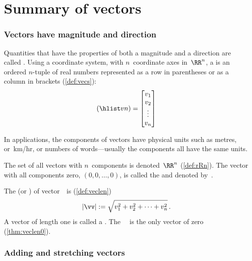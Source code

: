 
\section{Summary of vectors}
\label{sec:sumv}


\begin{itemize}
\def\index#1{}%

\subsubsection{Vectors have magnitude and direction}

\itemme Quantities that have the properties of both a magnitude and a direction are called .  
Using a coordinate system, with \(n\)~coordinate axes in~\(\RR^n\), a  is an ordered \(n\)-tuple of real numbers represented as a row in parentheses or as a column in brackets (\autoref{def:vecs}):
\begin{equation*}
(\hlist vn)=\begin{bmatrix} v_1\\v_2\\\vdots\\v_n \end{bmatrix}
\end{equation*}

In applications, the components of vectors have physical units such as metres, or~km/hr, or numbers of words---usually the components all have the same units.

\itemme The set of all vectors with \(n\)~components is denoted~\(\RR^n\) (\autoref{def:rRn}).
The vector with all components zero,  \((0,0,\ldots,0)\), is called the  and denoted by~\ov.

\itemhi  The  (or ) of vector~\vv\  is  (\autoref{def:veclen})
\begin{equation*}
|\vv|:=\sqrt{v_1^2+v_2^2+\cdots+v_n^2}\,.
\end{equation*}
A vector of length one is called a .
The ~\ov\ is the only vector of  zero (\autoref{thm:veclen0}).




\subsubsection{Adding and stretching vectors}


\end{itemize}
